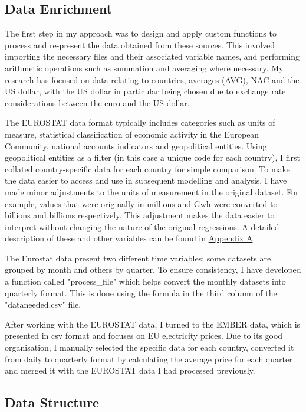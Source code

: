 \documentclass[12pt]{article}
\begin{document}
\subsection{Data Enrichment}

The first step in my approach was to design and apply custom functions to process and re-present the data obtained from these sources. This involved importing the necessary files and their associated variable names, and performing arithmetic operations such as summation and averaging where necessary. My research has focused on data relating to countries, averages (AVG), NAC and the US dollar, with the US dollar in particular being chosen due to exchange rate considerations between the euro and the US dollar.

The EUROSTAT data format typically includes categories such as units of measure, statistical classification of economic activity in the European Community, national accounts indicators and geopolitical entities. Using geopolitical entities as a filter (in this case a unique code for each country), I first collated country-specific data for each country for simple comparison. To make the data easier to access and use in subsequent modelling and analysis, I have made minor adjustments to the units of measurement in the original dataset. For example, values that were originally in millions and Gwh were converted to billions and billions respectively. This adjustment makes the data easier to interpret without changing the nature of the original regressions. A detailed description of these and other variables can be found in \hyperlink{A}{Appendix A}.

The Eurostat data present two different time variables; some datasets are grouped by month and others by quarter. To ensure consistency, I have developed a function called "process\_file" which helps convert the monthly datasets into quarterly format. This is done using the formula in the third column of the "dataneeded.csv" file.

After working with the EUROSTAT data, I turned to the EMBER data, which is presented in csv format and focuses on EU electricity prices. Due to its good organisation, I manually selected the specific data for each country, converted it from daily to quarterly format by calculating the average price for each quarter and merged it with the EUROSTAT data I had processed previously.



\subsection{Data Structure}
\end{document}
